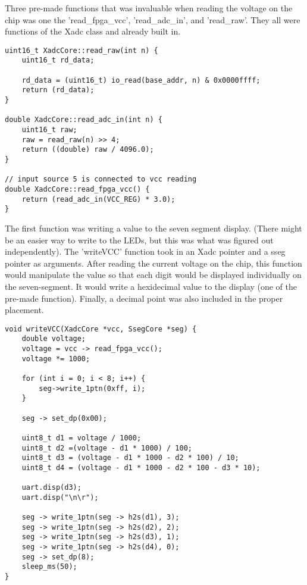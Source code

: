 \documentclass[11pt]{article}
\begin{document}
\quad Three pre-made functions that was invaluable when reading the voltage on the chip was one the 'read\_fpga\_vcc', 'read\_adc\_in', and 'read\_raw'. They all were functions of the Xadc class and already built in. 

\begin{lstlisting}[style=CStyle, caption = Xadc functions]
uint16_t XadcCore::read_raw(int n) {
	uint16_t rd_data;
	
	rd_data = (uint16_t) io_read(base_addr, n) & 0x0000ffff;
	return (rd_data);
}

double XadcCore::read_adc_in(int n) {
	uint16_t raw;
	raw = read_raw(n) >> 4;
	return ((double) raw / 4096.0);
}

// input source 5 is connected to vcc reading
double XadcCore::read_fpga_vcc() {
	return (read_adc_in(VCC_REG) * 3.0);
}
\end{lstlisting} 

\newpage
\quad The first function was writing a value to the seven segment display. (There might be an easier way to write to the LEDs, but this was what was figured out independently). The 'writeVCC' function took in an Xadc pointer and a sseg pointer as arguments. After reading the current voltage on the chip, this function would manipulate the value so that each digit would be displayed individually on the seven-segment. It would write a hexidecimal value to the display (one of the pre-made function). Finally, a decimal point was also included in the proper placement.   

\begin{lstlisting}[style=CStyle, caption = Writing Voltage to 7-seg]
void writeVCC(XadcCore *vcc, SsegCore *seg) {
	double voltage;
	voltage = vcc -> read_fpga_vcc();
	voltage *= 1000;
	
	for (int i = 0; i < 8; i++) {
		seg->write_1ptn(0xff, i);
	}
	
	seg -> set_dp(0x00);
	
	uint8_t d1 = voltage / 1000;
	uint8_t d2 =(voltage - d1 * 1000) / 100;
	uint8_t d3 = (voltage - d1 * 1000 - d2 * 100) / 10;
	uint8_t d4 = (voltage - d1 * 1000 - d2 * 100 - d3 * 10);
	
	uart.disp(d3);
	uart.disp("\n\r");
	
	seg -> write_1ptn(seg -> h2s(d1), 3);
	seg -> write_1ptn(seg -> h2s(d2), 2);
	seg -> write_1ptn(seg -> h2s(d3), 1);
	seg -> write_1ptn(seg -> h2s(d4), 0);
	seg -> set_dp(8);
	sleep_ms(50);
}
\end{lstlisting}
\end{document}
